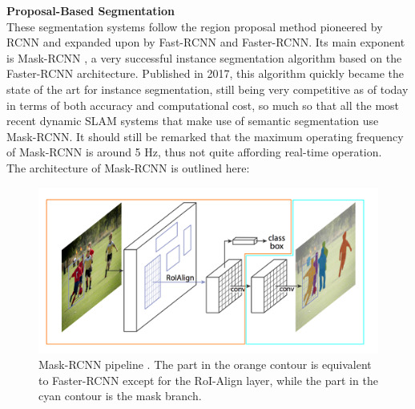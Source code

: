 \documentclass[12pt,twoside]{report}
\begin{document}
\textbf{Proposal-Based Segmentation}
\\

These segmentation systems follow the region proposal method pioneered by RCNN and expanded upon by Fast-RCNN and Faster-RCNN. Its main exponent is Mask-RCNN \cite{maskrcnn}, a very successful instance segmentation algorithm based on the Faster-RCNN architecture. Published in 2017, this algorithm quickly became the state of the art for instance segmentation, still being very competitive as of today in terms of both accuracy and computational cost, so much so that all the most recent dynamic SLAM systems that make use of semantic segmentation use Mask-RCNN. It should still be remarked that the maximum operating frequency of Mask-RCNN is around 5 Hz, thus not quite affording real-time operation.
\\

The architecture of Mask-RCNN is outlined here:

\begin{figure}[ht]%
\centering
\includegraphics[width = 1\hsize]{./figures/maskrcnn}
\caption{Mask-RCNN pipeline \cite{maskrcnn}. The part in the orange contour is equivalent to Faster-RCNN except for the RoI-Align layer, while the part in the cyan contour is the mask branch.}
\label{fig:maskrcnn}
\end{figure}
\end{document}

